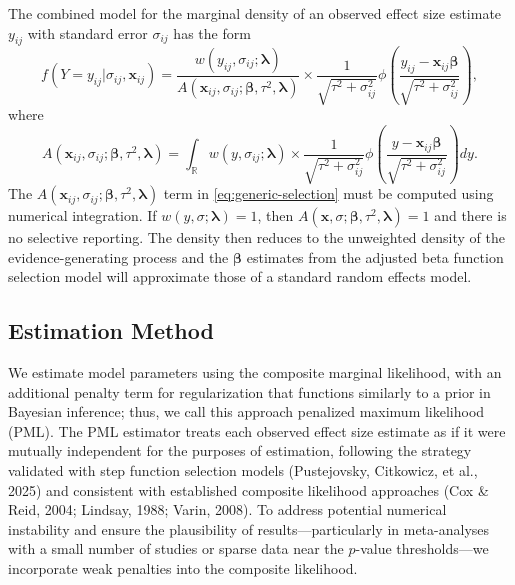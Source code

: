 \documentclass[
  american,
  man, donotrepeattitle,floatsintext]{apa7}
\begin{document}
The combined model for the marginal density of an observed effect size estimate \(y_{ij}\) with standard error \(\sigma_{ij}\) has the form
\begin{equation}
\label{eq:generic-selection}
f(Y = y_{ij} | \sigma_{ij}, \mathbf{x}_{ij}) = \frac{w\left(y_{ij}, \sigma_{ij}; \boldsymbol\lambda \right)}{A(\mathbf{x}_{ij}, \sigma_{ij}; \boldsymbol\beta, \tau^2, \boldsymbol\lambda)} \times \frac{1}{\sqrt{\tau^2 + \sigma_{ij}^2}} \phi\left(\frac{y_{ij} - \mathbf{x}_{ij} \boldsymbol\beta}{\sqrt{\tau^2 + \sigma_{ij}^2}}\right),
\end{equation}
where
\begin{equation}
\label{eq:generic-selection-A}
A(\mathbf{x}_{ij}, \sigma_{ij}; \boldsymbol\beta, \tau^2, \boldsymbol\lambda) =  \int_\mathbb{R} w\left(y, \sigma_{ij}; \boldsymbol\lambda \right) \times  \frac{1}{\sqrt{\tau^2 + \sigma_{ij}^2}}\phi\left(\frac{y - \mathbf{x}_{ij}\boldsymbol\beta}{\sqrt{\tau^2 + \sigma_{ij}^2}}\right) dy.
\end{equation}
The \(A(\mathbf{x}_{ij}, \sigma_{ij}; \boldsymbol\beta, \tau^2, \boldsymbol\lambda)\) term in \eqref{eq:generic-selection} must be computed using numerical integration.
If \(w(y, \sigma; \boldsymbol\lambda) = 1\), then \(A(\mathbf{x}, \sigma; \boldsymbol\beta, \tau^2, \boldsymbol\lambda) = 1\) and there is no selective reporting.
The density then reduces to the unweighted density of the evidence-generating process and the \(\boldsymbol\beta\) estimates from the adjusted beta function selection model will approximate those of a standard random effects model.

\subsection{Estimation Method}\label{estimation-method}

We estimate model parameters using the composite marginal likelihood, with an additional penalty term for regularization that functions similarly to a prior in Bayesian inference; thus, we call this approach penalized maximum likelihood (PML).
The PML estimator treats each observed effect size estimate as if it were mutually independent for the purposes of estimation, following the strategy validated with step function selection models (Pustejovsky, Citkowicz, et al., 2025) and consistent with established composite likelihood approaches (Cox \& Reid, 2004; Lindsay, 1988; Varin, 2008).
To address potential numerical instability and ensure the plausibility of results---particularly in meta-analyses with a small number of studies or sparse data near the \(p\)-value thresholds---we incorporate weak penalties into the composite likelihood.
\end{document}
